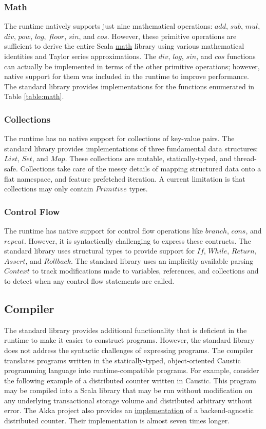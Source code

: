 \documentclass[12pt]{article}
\begin{document}
\subsubsection{Math}
The runtime natively supports just nine mathematical operations: $add$, $sub$, $mul$, $div$,
$pow$, $log$, $floor$, $sin$, and $cos$. However, these primitive operations are sufficient to
derive the entire Scala \href{https://www.scala-lang.org/api/2.12.1/scala/math/index.html}{math}
library using various mathematical identities and Taylor series approximations. The $div$,
$log$, $sin$, and $cos$ functions can actually be implemented in terms of the other primitive
operations; however, native support for them was included in the runtime to improve performance.
The standard library provides implementations for the functions enumerated in Table
\ref{table:math}.

\subsubsection{Collections}
The runtime has no native support for collections of key-value pairs. The standard library
provides implementations of three fundamental data structures: $List$, $Set$, and $Map$. These
collections are mutable, statically-typed, and thread-safe. Collections take care of the messy
details of mapping structured data onto a flat namespace, and feature prefetched iteration. A
current limitation is that collections may only contain $Primitive$ types.

\subsubsection{Control Flow}
The runtime has native support for control flow operations like $branch$, $cons$, and $repeat$.
However, it is syntactically challenging to express these contructs. The standard library
uses structural types to provide support for $If$, $While$, $Return$, $Assert$, and $Rollback$.
The standard library uses an implicitly available parsing $Context$ to track modifications made
to variables, references, and collections and to detect when any control flow statements are
called.

\subsection{Compiler}
The standard library provides additional functionality that is deficient in the runtime to make it
easier to construct programs. However, the standard library does not address the syntactic
challenges of expressing programs. The compiler translates programs written in the
statically-typed, object-oriented Caustic programming language into runtime-compatible programs.
For example, consider the following example of a distributed counter written in Caustic. This
program may be compiled into a Scala library that may be run without modification on any
underlying transactional storage volume and distributed arbitrary without error. The Akka project
also provides an \href{https://git.io/vxS6u}{implementation} of a backend-agnostic distributed
counter. Their implementation is almost seven times longer.
\end{document}
